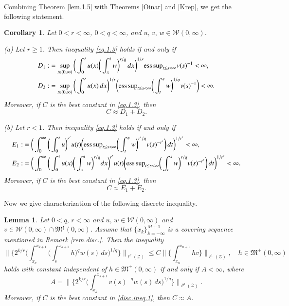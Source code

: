 \documentclass[12pt]{amsart}
\theoremstyle{plain}
\newtheorem{lem}[thm]{Lemma}
\newtheorem{cor}[thm]{Corollary}
\theoremstyle{definition}
\numberwithin{thm}{section}
\numberwithin{equation}{section}
\begin{document}
Combining Theorem \ref{lem.1.5} with Theorems \ref{Oinar} and \ref{Krep}, we get the following statement.
\begin{cor}\label{cor.1.1}
	Let $0 < r < \infty$, $0 < q < \infty$, and  $u,\,v,\,w \in {\mathcal W}{(0,\infty)}$.
	
	{\rm (a)} Let $r \ge 1$. Then inequality \eqref{eq.1.3} holds if and only if
	\begin{align*}
	D_1 : & = \sup_{t \in (0,\infty)} \bigg( \int_0^t   u(x) \bigg( \int_x^t w \bigg)^{r / q}  \,dx \bigg)^{1 / r} {\operatornamewithlimits{ess\,sup}}_{t \le  s < \infty } v(s)^{-1} < \infty, \\
	D_2 : & = \sup_{t \in (0,\infty)}  \bigg( \int_0^t u(x) \,dx \bigg)^{1/r}  \bigg( {\operatornamewithlimits{ess\,sup}}_{t \le s < \infty} \bigg( \int_t^s w \bigg)^{1/q} v(s)^{-1} \bigg) < \infty.
	\end{align*}
	Moreover, if $C$ is the best constant in \eqref{eq.1.3}, then 
	$$
	C \approx D_1 + D_2. 
	$$
	
	{\rm (b)} Let $r < 1$. Then inequality \eqref{eq.1.3} holds if and only if
	\begin{align*}
	E_1 : & = \bigg( \int_0^{\infty}  \bigg( \int_0^t u \bigg)^{r'}  u(t) \bigg( {\operatornamewithlimits{ess\,sup}}_{t \le s < \infty} \bigg(
	\int_t^s w \bigg)^{r' / q} v(s)^{-r'}\bigg) \,dt\bigg)^{1/r'} < \infty, \\
	E_2 : & = \bigg( \int_0^{\infty}  \bigg( \int_0^t u(x) \bigg( \int_x^t w \bigg)^{r / q} dx \bigg)^{r'} u(t) \bigg( {\operatornamewithlimits{ess\,sup}}_{t \le s < \infty} \bigg( \int_t^s w \bigg)^{r/q} v(s)^{-r'} \bigg) \,dt\bigg)^{1/r'}  < \infty.
	\end{align*}
	Moreover, if $C$ is the best constant in \eqref{eq.1.3}, then 
	$$
	C \approx E_1 + E_2. 
	$$	
\end{cor}

Now we give characterization of the following discrete inequality.
\begin{lem}\label{lem.1.6}
	Let $0 < q,\, r < \infty$ and  $u,\,w \in {\mathcal W}(0,\infty)$ and $v \in {\mathcal W}(0,\infty) \cap {{\mathfrak M}}^{\uparrow}(0,\infty)$. Assume that $\{x_k\}_{k=-\infty}^{M + 1}$ is a covering sequence mentioned in Remark \ref{rem.disc.}.
	Then the inequality
	\begin{equation}\label{disc.ineq.1}
	\bigg\| \bigg\{ 2^{k / r} \bigg( \int_{x_k}^{x_{k+1}} \bigg( \int_s^{x_{k+1}} h \bigg)^q
	w(s)\,ds\bigg)^{ 1 / q} \bigg\} \bigg\|_{\ell^r({\mathcal Z})} \le C \bigg\| \bigg\{ \int_{x_n}^{x_{n+1}} h v \bigg\} \bigg\|_{\ell^1 ({\mathcal Z})}, \quad h \in {\mathfrak M}^+(0,\infty) 
	\end{equation}
	holds with constant independent of $h \in {\mathfrak M}^+(0,\infty)$ if and only if $A < \infty$, where
	$$
	A = \bigg\| \bigg\{ 2^{k / r} \bigg( \int_{x_k}^{x_{k+1}} v(s)^{-q} w(s)\,ds\bigg)^{ 1 / q} \bigg\} \bigg\|_{\ell^{\rho}({\mathcal Z})}.
	$$
	Moreover, if $C$ is the best constant in \eqref{disc.ineq.1}, then $C \approx A$.	
\end{lem}
\end{document}
